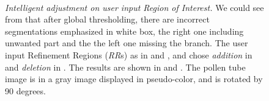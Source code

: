 \begin{figure}
\caption[Intelligent adjustment on user input Region of Interest]{\label{Figure: maskDemo} \emph{Intelligent adjustment on user input Region of Interest.} We could see from \protect{} that after global thresholding, there are incorrect segmentations emphasized in white box, the right one including unwanted part and the the left one missing the branch. The user input Refinement Regions (\emph{RR}s) as in \protect{} and \protect{}, and chose \emph{addition} in \protect{} and \emph{deletion} in \protect{}. The results are shown in \protect{} and \protect{}. The pollen tube image is in a gray image displayed in pseudo-color, and \protect{} is rotated by 90 degrees.}
\\
\end{figure}

